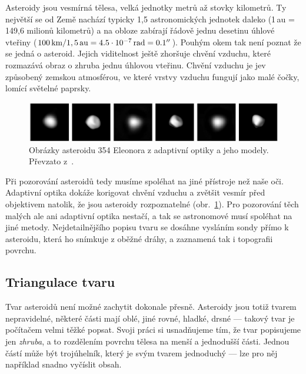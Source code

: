 \documentclass[11pt]{article}
\begin{document}
Asteroidy jsou vesmírná tělesa, velká jednotky metrů až stovky kilometrů. Ty největší se od Země nachází typicky 1,5 astronomických jednotek daleko (1\,au = 149,6 milionů kilometrů) a na obloze zabírají řádově jednu desetinu úhlové vteřiny ($100\,{\rm km} / 1,5\,{\rm au} = 4.5\cdot 10^{-7}\,{\rm rad} = 0.1''$). Pouhým okem tak není poznat že se jedná o asteroid. Jejich viditelnost ještě zhoršuje chvění vzduchu, které rozmazává obraz o zhruba jednu úhlovou vteřinu. Chvění vzduchu je jev způsobený zemskou atmosférou, ve které vrstvy vzduchu fungují jako malé čočky, lomící světelné paprsky. 

\begin{figure}[h]
\includegraphics[width=15cm]{figs/adaptive_optics_asteroids.png}
\centering
\caption{Obrázky asteroidu 354 Eleonora z adaptivní optiky a jeho modely.
Převzato z~\cite{Viikinkoski_2017A&A...607A.117V}.}
\label{adaptive_optics_asteroids}
\end{figure}

Při pozorování asteroidů tedy musíme spoléhat na jiné přístroje než naše oči. Adaptivní optika dokáže korigovat chvění vzduchu a zvětšit vesmír před objektivem natolik, že jsou asteroidy rozpoznatelné (obr.~\ref{adaptive_optics_asteroids}). Pro pozorování těch malých ale ani adaptivní optika nestačí, a tak se astronomové musí spoléhat na jiné metody. Nejdetailnějšího popisu tvaru se dosáhne vysláním sondy přímo k asteroidu, která ho snímkuje z oběžné dráhy, a zaznamená tak i topografii povrchu.



\subsection{Triangulace tvaru}

Tvar asteroidů není možné zachytit dokonale přesně. Asteroidy jsou totiž tvarem nepravidelné, některé části mají oblé, jiné rovné, hladké, drsné --- takový tvar je počítačem velmi těžké popsat. Svoji práci si usnadňujeme tím, že tvar popisujeme jen {\em zhruba\/}, a to rozdělením povrchu tělesa na menší a jednodušší části. Jednou částí může být trojúhelník, který je svým tvarem jednoduchý --- lze pro něj například snadno vyčíslit obsah. 
\end{document}
